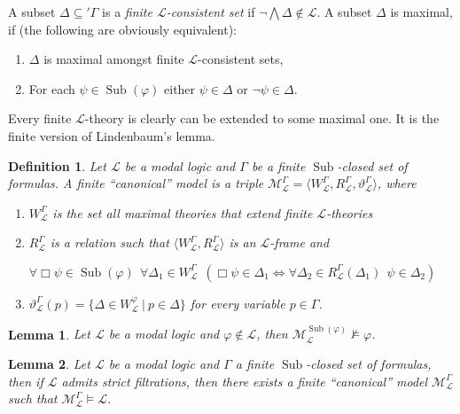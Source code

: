 \documentclass[a4paper]{article}
\theoremstyle{defin}
\newtheorem{defin}{Definition}
\theoremstyle{theorem}
\theoremstyle{prop}
\theoremstyle{lemma}
\newtheorem{lemma}{Lemma}
\theoremstyle{fact}
\theoremstyle{ex}
\theoremstyle{col}
\theoremstyle{claim}
\begin{document}
A subset $\Delta \subseteq '\Gamma$ is a \emph{finite $\mathcal{L}$-consistent set} if $\neg \bigwedge \Delta \notin \mathcal{L}$. A subset $\Delta$ is maximal, if (the following are obviously equivalent):
\begin{enumerate}
  \item $\Delta$ is maximal amongst finite $\mathcal{L}$-consistent sets,
  \item For each $\psi \in \operatorname{Sub}(\varphi)$ either $\psi \in \Delta$ or
  $\neg \psi \in \Delta$.
\end{enumerate}

Every finite $\mathcal{L}$-theory is clearly can be extended to some maximal one. It is the finite version of Lindenbaum's lemma.

\begin{defin}\label{fin}
  Let $\mathcal{L}$ be a modal logic and $\Gamma$ be a finite $\operatorname{Sub}$-closed set of formulas. A finite ``canonical'' model is a triple $\mathcal{M}_{\mathcal{L}}^{\Gamma} = \langle W_{\mathcal{L}}^{\Gamma}, R_{\mathcal{L}}^{\Gamma}, \vartheta_{\mathcal{L}}^{\Gamma} \rangle$, where
  \begin{enumerate}
    \item $W_{\mathcal{L}}^{\Gamma}$ is the set all maximal theories that extend finite $\mathcal{L}$-theories
    \item $R_{\mathcal{L}}^{\Gamma}$ is a relation such that
    $\langle W_{\mathcal{L}}^{\Gamma}, R_{\mathcal{L}}^{\Gamma} \rangle$ is an $\mathcal{L}$-frame
    and
    \begin{center}
    $\forall \Box \psi \in \operatorname{Sub}(\varphi) \:\:
    \forall \Delta_1 \in W_{\mathcal{L}}^{\Gamma} \:\: (\Box \psi \in \Delta_1 \Leftrightarrow
    \forall \Delta_2 \in R_{\mathcal{L}}^{\Gamma}(\Delta_1) \:\: \psi \in \Delta_2)$
    \end{center}
    \item $\vartheta_{\mathcal{L}}^{\Gamma}(p) = \{ \Delta \in W_{\mathcal{L}}^{\varphi} \: | \: p \in \Delta \}$ for every variable $p \in \Gamma$.
  \end{enumerate}
\end{defin}

\begin{lemma}\label{good}
  Let $\mathcal{L}$ be a modal logic and $\varphi \not\in \mathcal{L}$, then $\mathcal{M}_{\mathcal{L}}^{\operatorname{Sub}(\varphi)} \nvDash \varphi$.
\end{lemma}

\begin{lemma} Let $\mathcal{L}$ be a modal logic and $\Gamma$ a finite $\operatorname{Sub}$-closed set of formulas, then if $\mathcal{L}$ admits strict filtrations, then there exists a finite ``canonical'' model $\mathcal{M}_{\mathcal{L}}^{\Gamma}$ such that $\mathcal{M}_{\mathcal{L}}^{\Gamma} \models \mathcal{L}$.
\end{lemma}
\end{document}
